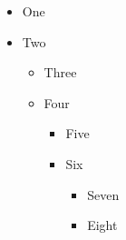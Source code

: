 \documentclass{article}
\begin{document}
\begin{itemize}
  \item One
  \item Two
    \begin{itemize}
      \item Three
      \item Four
        \begin{itemize}
          \item Five
          \item Six
            \begin{itemize}
              \item Seven
              \item Eight
            \end{itemize}
        \end{itemize}
    \end{itemize}
\end{itemize}
\end{document}
